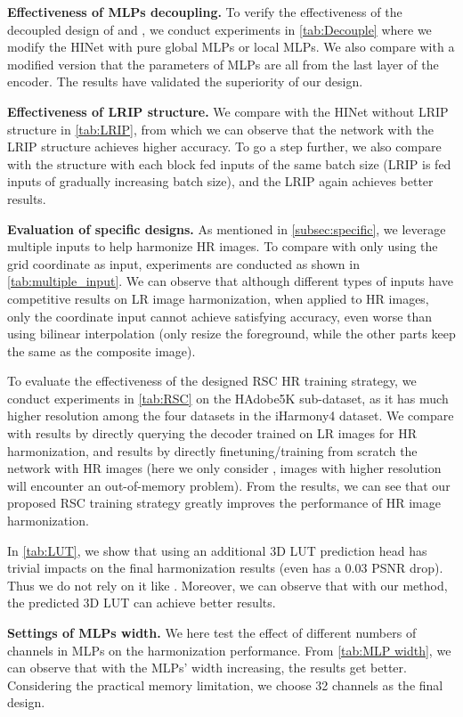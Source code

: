 \documentclass[10pt,journal,twocolumn,twoside]{IEEEtran}
\begin{document}
\textbf{Effectiveness of MLPs decoupling.} To verify the effectiveness of the decoupled design of  and , we conduct experiments in \cref{tab:Decouple} where we modify the HINet with pure global MLPs or local MLPs. We also compare with a modified version that the parameters of MLPs are all from the last layer of the encoder. The results have validated the superiority of our design.

\textbf{Effectiveness of LRIP structure.} We compare with the HINet without LRIP structure in \cref{tab:LRIP}, from which we can observe that the network with the LRIP structure achieves higher accuracy. To go a step further, we also compare with the structure with each block fed inputs of the same batch size (LRIP is fed inputs of gradually increasing batch size), and the LRIP again achieves better results.

\textbf{Evaluation of specific designs.} As mentioned in \cref{subsec:specific}, we leverage multiple inputs to help harmonize HR images. To compare with only using the grid coordinate as input, experiments are conducted as shown in \cref{tab:multiple_input}. We can observe that although different types of inputs have competitive results on LR image harmonization, when applied to HR images, only the coordinate input cannot achieve satisfying accuracy, even worse than using bilinear interpolation (only resize the foreground, while the other parts keep the same as the composite image).

To evaluate the effectiveness of the designed RSC HR training strategy, we conduct experiments in \cref{tab:RSC} on the HAdobe5K sub-dataset, as it has much higher resolution among the four datasets in the iHarmony4 dataset\cite{cong2022high}. We compare with results by directly querying the decoder trained on LR images for HR harmonization, and results by directly finetuning/training from scratch the network with HR images (here we only consider , images with higher resolution will encounter an out-of-memory problem). From the results, we can see that our proposed RSC training strategy greatly improves the performance of HR image harmonization.

In \cref{tab:LUT}, we show that using an additional 3D LUT prediction head has trivial impacts on the final harmonization results (even has a 0.03 PSNR drop). Thus we do not rely on it like \cite{cong2022high, xue2022dccf, ke2022harmonizer}. Moreover, we can observe that with our method, the predicted 3D LUT can achieve better results.


\textbf{Settings of MLPs width.} We here test the effect of different numbers of channels in MLPs on the harmonization performance. From \cref{tab:MLP width}, we can observe that with the MLPs' width increasing, the results get better. Considering the practical memory limitation, we choose 32 channels as the final design.
\end{document}
